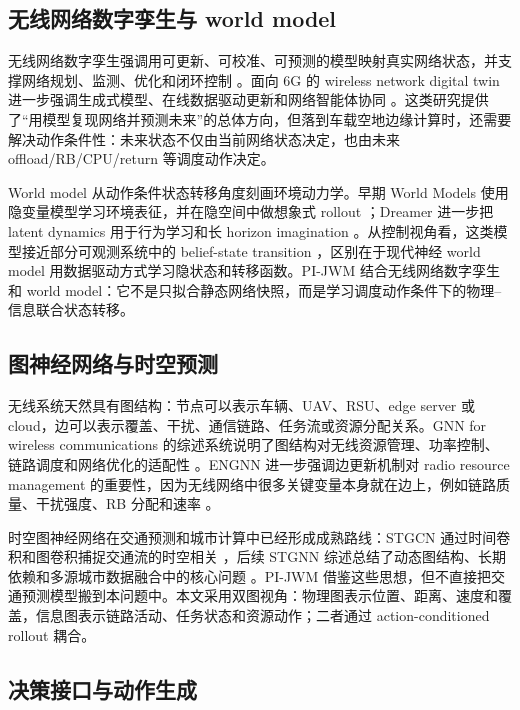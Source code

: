 \documentclass[letterpaper,journal]{IEEEtran}
\newcommand{\pjwm}{PI-JWM}
\begin{document}
\subsection{无线网络数字孪生与 world model}

无线网络数字孪生强调用可更新、可校准、可预测的模型映射真实网络状态，并支撑网络规划、监测、优化和闭环控制 \cite{khan2022dt}。面向 6G 的 wireless network digital twin 进一步强调生成式模型、在线数据驱动更新和网络智能体协同 \cite{tao2024wndt}。这类研究提供了“用模型复现网络并预测未来”的总体方向，但落到车载空地边缘计算时，还需要解决动作条件性：未来状态不仅由当前网络状态决定，也由未来 offload/RB/CPU/return 等调度动作决定。

World model 从动作条件状态转移角度刻画环境动力学。早期 World Models 使用隐变量模型学习环境表征，并在隐空间中做想象式 rollout \cite{ha2018worldmodels}；Dreamer 进一步把 latent dynamics 用于行为学习和长 horizon imagination \cite{hafner2019dreamer}。从控制视角看，这类模型接近部分可观测系统中的 belief-state transition \cite{kaelbling1998pomdp}，区别在于现代神经 world model 用数据驱动方式学习隐状态和转移函数。\pjwm{} 结合无线网络数字孪生和 world model：它不是只拟合静态网络快照，而是学习调度动作条件下的物理--信息联合状态转移。

\subsection{图神经网络与时空预测}

无线系统天然具有图结构：节点可以表示车辆、UAV、RSU、edge server 或 cloud，边可以表示覆盖、干扰、通信链路、任务流或资源分配关系。GNN for wireless communications 的综述系统说明了图结构对无线资源管理、功率控制、链路调度和网络优化的适配性 \cite{shen2023gnnwireless}。ENGNN 进一步强调边更新机制对 radio resource management 的重要性，因为无线网络中很多关键变量本身就在边上，例如链路质量、干扰强度、RB 分配和速率 \cite{engnn2024}。

时空图神经网络在交通预测和城市计算中已经形成成熟路线：STGCN 通过时间卷积和图卷积捕捉交通流的时空相关 \cite{yu2018stgcn}，后续 STGNN 综述总结了动态图结构、长期依赖和多源城市数据融合中的核心问题 \cite{jin2024stgnn}\cite{jin2024gnnts}。PI-JWM 借鉴这些思想，但不直接把交通预测模型搬到本问题中。本文采用双图视角：物理图表示位置、距离、速度和覆盖，信息图表示链路活动、任务状态和资源动作；二者通过 action-conditioned rollout 耦合。

\subsection{决策接口与动作生成}
\end{document}
